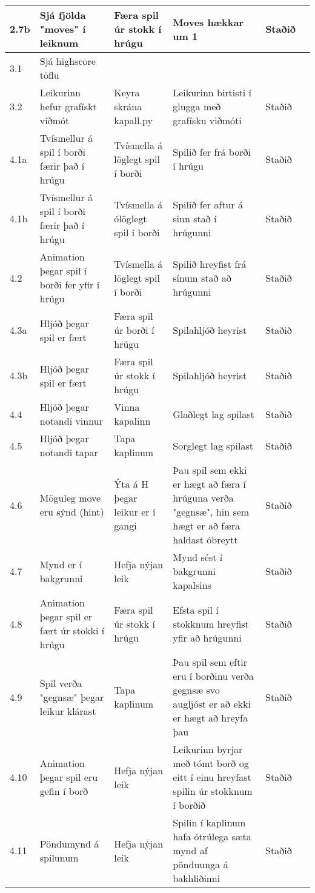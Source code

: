 \documentclass[11pt,a4paper,titlepage]{article}
\theoremstyle{plain}
\theoremstyle{remark}
\begin{document}
\begin{longtable}{| m{1.7cm} | m{2.7cm} | m{3.3cm} | m{4cm} | m{1.4cm} | m{1.3cm} |}
\hline
2.7b & Sjá fjölda "moves" í leiknum	& Færa spil úr stokk í hrúgu & Moves hækkar um 1 & Staðið & \\
\hline
3.1	& Sjá highscore töflu & & & & \\
\hline
3.2	& Leikurinn hefur grafískt viðmót	&	Keyra skrána kapall.py	&	Leikurinn birtisti í glugga með grafísku viðmóti	&	Staðið	&		\\
\hline
4.1a	&	Tvísmellur á spil í borði færir það í hrúgu	&	Tvísmella á löglegt spil í borði 	&	Spilið fer frá borði í hrúgu	&	Staðið	&		\\
\hline
4.1b	&	Tvísmellur á spil í borði færir það í hrúgu	&	Tvísmella á ólöglegt spil í borði 	&	Spilið fer aftur á sinn stað í hrúgunni	&	Staðið	&		\\
\hline
4.2	&	Animation þegar spil í borði fer yfir í hrúgu	&	Tvísmella á löglegt spil í borði 	&	Spilið hreyfist frá sínum stað að hrúgunni	&	Staðið	&		\\
\hline
4.3a	&	Hljóð þegar spil er fært	&	Færa spil úr borði í hrúgu 	&	Spilahljóð heyrist	&	Staðið	&		\\
\hline
4.3b	&	Hljóð þegar spil er fært	&	Færa spil úr stokk í hrúgu 	&	Spilahljóð heyrist	&	Staðið	&		\\
\hline
4.4	&	Hljóð þegar notandi vinnur	&	Vinna kapalinn	&	Glaðlegt lag spilast	&	Staðið	&		\\
\hline
4.5	&	Hljóð þegar notandi tapar	&	Tapa kaplinum	&	Sorglegt lag spilast	&	Staðið	&		\\
\hline
4.6	&	Möguleg move eru sýnd (hint) & Ýta á H þegar leikur er í gangi	&	Þau spil sem ekki er hægt að færa í hrúguna verða "gegnsæ", hin sem hægt er að færa haldast óbreytt	&	Staðið	&		\\
\hline
4.7	&	Mynd er í bakgrunni	&	Hefja nýjan leik	&	Mynd sést í bakgrunni kapalsins	&	Staðið	&		\\
\hline
4.8	&	Animation þegar spil er fært úr stokki í hrúgu	&	Færa spil úr stokk í hrúgu 	&	Efsta spil í stokknum hreyfist yfir að hrúgunni	&	Staðið	&		\\
\hline
4.9	&	Spil verða "gegnsæ" þegar leikur klárast	&	Tapa kaplinum	&	Þau spil sem eftir eru í borðinu verða gegnsæ svo augljóst er að ekki er hægt að hreyfa þau	&	Staðið	&		\\
\hline
4.10	&	Animation þegar spil eru gefin í borð	&	Hefja nýjan leik	&	Leikurinn byrjar með tómt borð og eitt í einu hreyfast spilin úr stokknum í borðið	&	Staðið	&		\\
\hline
4.11	&	Pöndumynd á spilunum	&	Hefja nýjan leik	&	Spilin í kaplinum hafa ótrúlega sæta mynd af pönduunga á bakhliðinni	&	Staðið	&		\\
\hline
\end{longtable}
\end{document}
